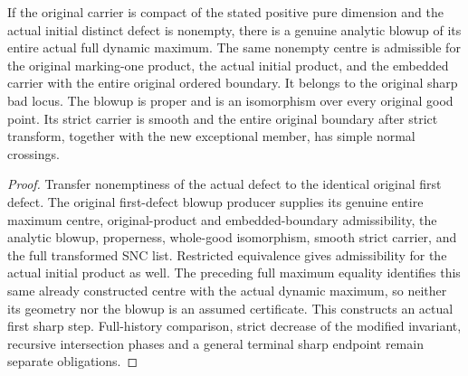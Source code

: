 \begin{theorem}
\label{hir:sharp-actual-initial-dynamic-whole-good-blowup}
If the original carrier is compact of the stated positive pure dimension and
the actual initial distinct defect is nonempty, there is a genuine analytic
blowup of its entire actual full dynamic maximum. The same nonempty centre
is admissible for the original marking-one product, the actual initial
product, and the embedded carrier with the entire original ordered boundary.
It belongs to the original sharp bad locus. The blowup is proper and is an
isomorphism over every original good point. Its strict carrier is smooth and
the entire original boundary after strict transform, together with the new
exceptional member, has simple normal crossings.
\end{theorem}
\begin{proof}
Transfer nonemptiness of the actual defect to the identical original first
defect. The original first-defect blowup producer supplies its genuine entire
maximum centre, original-product and embedded-boundary admissibility, the
analytic blowup, properness, whole-good isomorphism, smooth strict carrier,
and the full transformed SNC list. Restricted equivalence gives admissibility
for the actual initial product as well. The preceding full maximum equality
identifies this same already constructed centre with the actual dynamic
maximum, so neither its geometry nor the blowup is an assumed certificate.
This constructs an actual first sharp step. Full-history comparison, strict
decrease of the modified invariant, recursive intersection phases and a
general terminal sharp endpoint remain separate obligations.
\leanok
\end{proof}
